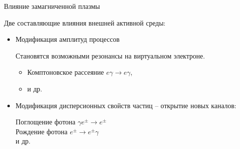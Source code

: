 \documentclass{beamer}
\begin{document}
\begin{frame}{Влияние замагниченной плазмы}
	\begin{center}
		Две составляющие влияния внешней активной среды:
	\end{center}
	\begin{itemize}
		\item \alert{Модификация амплитуд процессов}
		
		Становятся возможными \alert{резонансы} на виртуальном электроне.
		
		\begin{itemize}
			\item Комптоновское рассеяние $e\gamma\to e \gamma$,
			\item и др.
		\end{itemize}
		\item \alert{Модификация дисперсионных свойств частиц -- открытие новых 
		каналов:}
		
		Поглощение фотона $\gamma e^\pm\to e^\pm$\\
		Рождение фотона $e^\pm\to e^\pm\gamma$\\
		и др.
	\end{itemize}
\end{frame}
\end{document}
